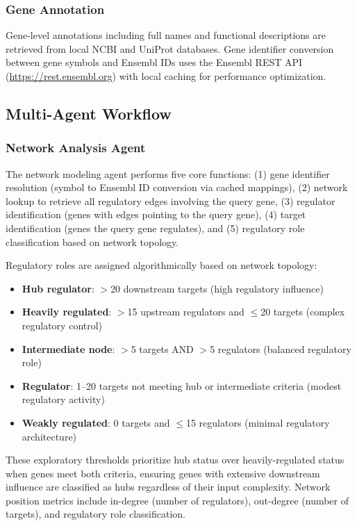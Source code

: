 \documentclass[11pt]{article}
\begin{document}
\subsubsection{Gene Annotation}

Gene-level annotations including full names and functional descriptions are retrieved from local NCBI and UniProt databases. Gene identifier conversion between gene symbols and Ensembl IDs uses the Ensembl REST API (\url{https://rest.ensembl.org}) \cite{ensembl2020} with local caching for performance optimization.

\subsection{Multi-Agent Workflow}

\subsubsection{Network Analysis Agent}

The network modeling agent performs five core functions: (1) gene identifier resolution (symbol to Ensembl ID conversion via cached mappings), (2) network lookup to retrieve all regulatory edges involving the query gene, (3) regulator identification (genes with edges pointing to the query gene), (4) target identification (genes the query gene regulates), and (5) regulatory role classification based on network topology.

Regulatory roles are assigned algorithmically based on network topology:
\begin{itemize}
\item \textbf{Hub regulator}: $>$20 downstream targets (high regulatory influence)
\item \textbf{Heavily regulated}: $>$15 upstream regulators and $\leq$20 targets (complex regulatory control)
\item \textbf{Intermediate node}: $>$5 targets AND $>$5 regulators (balanced regulatory role)
\item \textbf{Regulator}: 1--20 targets not meeting hub or intermediate criteria (modest regulatory activity)
\item \textbf{Weakly regulated}: 0 targets and $\leq$15 regulators (minimal regulatory architecture)
\end{itemize}

These exploratory thresholds prioritize hub status over heavily-regulated status when genes meet both criteria, ensuring genes with extensive downstream influence are classified as hubs regardless of their input complexity. Network position metrics include in-degree (number of regulators), out-degree (number of targets), and regulatory role classification.
\end{document}
